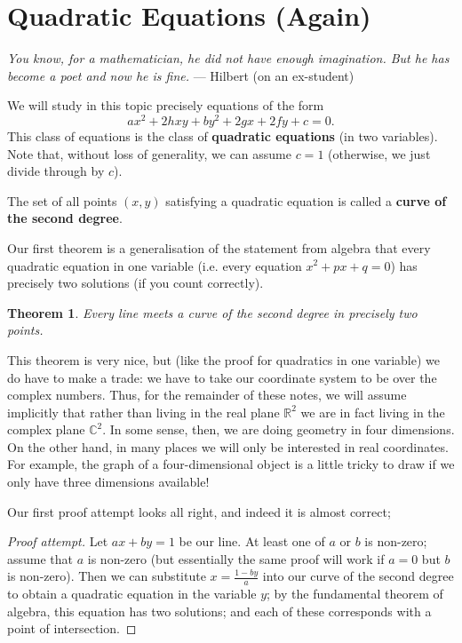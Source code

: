 \documentclass[a4paper,leqno]{article}
\numberwithin{equation}{section}
\newtheorem{thm}[equation]{Theorem}
\theoremstyle{definition}
\theoremstyle{remark}
\newcommand{\df}[1]{\textbf{#1}}
\begin{document}
\section{Quadratic Equations (Again)}
\begin{center}
  \emph{You know, for a mathematician, he did not have enough imagination. But he has become a poet and now he is fine.} --- Hilbert (on an ex-student)
\end{center}
We will study in this topic precisely equations of the form
\begin{equation}\label{eqn:prototype}
  ax^2 + 2hxy + by^2 + 2gx + 2fy + c = 0.
\end{equation}
This class of equations is the class of \df{quadratic equations} (in two variables). Note that, without loss
of generality, we can assume $ c = 1 $ (otherwise, we just divide through by $ c $).

The set of all points $ (x,y) $ satisfying a quadratic equation is called a \df{curve of the second degree}.

Our first theorem is a generalisation of the statement from algebra that every quadratic equation in one variable
(i.e. every equation $ x^2 + px + q = 0 $) has precisely two solutions (if you count correctly).
\begin{thm}\label{thm:funthmquad}
  Every line meets a curve of the second degree in precisely two points.
\end{thm}

This theorem is very nice, but (like the proof for quadratics in one variable) we do have to make a trade:
we have to take our coordinate system to be over the complex numbers. Thus, for the remainder of these notes,
we will assume implicitly that rather than living in the real plane $ \mathbb{R}^2 $ we are in fact living
in the complex plane $ \mathbb{C}^2 $. In some sense, then, we are doing geometry in four dimensions. On the
other hand, in many places we will only be interested in real coordinates. For example, the graph of a four-dimensional
object is a little tricky to draw if we only have three dimensions available!

Our first proof attempt looks all right, and indeed it is almost correct;

\begin{proof}[Proof attempt]
  Let $ ax + by = 1 $ be our line. At least one of $ a $ or $ b $ is non-zero; assume that $ a $ is
  non-zero (but essentially the same proof will work if $ a = 0 $ but $ b $ is non-zero). Then we
  can substitute $ x = \frac{1 - by}{a} $ into our curve of the second degree to obtain a quadratic
  equation in the variable $ y $; by the fundamental theorem of algebra, this equation has two solutions;
  and each of these corresponds with a point of intersection.
\end{proof}
\end{document}
